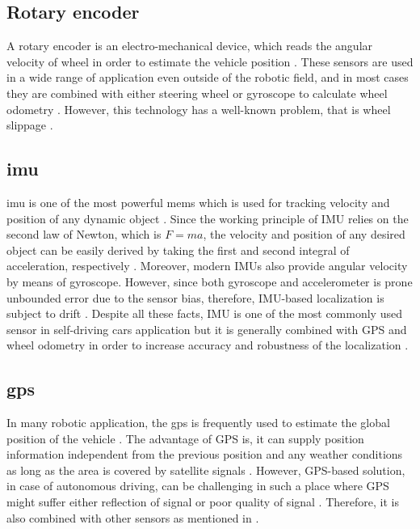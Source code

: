 \subsection*{Rotary encoder}

A rotary encoder is an electro-mechanical device, which reads the angular velocity of wheel in order to estimate the vehicle position \cite{chp2.6}. These sensors are used in a wide range of application even outside of the robotic field, and in most cases they are combined with either steering wheel or gyroscope to calculate wheel odometry \cite{sensor}. However, this technology has a well-known problem, that is wheel slippage \cite{odomja, odometry, odometry1}.

\subsection*{\acrfull{imu}}
\acrshort{imu} is one of the most powerful \acrfull{mems} which is used for tracking velocity and position of any dynamic object \cite{chp2.7}. Since the working principle of IMU relies on the second law of Newton, which is $F=ma$, the velocity and position of any desired object can be easily derived by taking the first and second integral of acceleration, respectively \cite{chp2.7}. Moreover, modern IMUs also provide angular velocity by means of gyroscope. However, since both gyroscope and accelerometer is prone unbounded error due to the sensor bias, therefore, IMU-based localization is subject to drift \cite{chp2.9}. Despite all these facts, IMU is one of the most commonly used sensor in self-driving cars application but it is generally combined with GPS and wheel odometry in order to increase accuracy and robustness of the localization \cite{ACs1,ACs2,chp2.4,chp2.5}.

\subsection*{\acrfull{gps}}
In many robotic application, the \acrshort{gps} is frequently used to estimate the global position of the vehicle \cite{chp2.6}. The advantage of GPS is, it can supply position information independent from the previous position and any weather conditions as long as the area is covered by satellite signals \cite{chp2.6}. However, GPS-based solution, in case of autonomous driving, can be challenging in such a place where GPS might suffer either reflection of signal or poor quality of signal \cite{chp2.10}. Therefore, it is also combined with other sensors as mentioned in \cite{chp2.4,chp2.5,kalman2,kalman6}.

